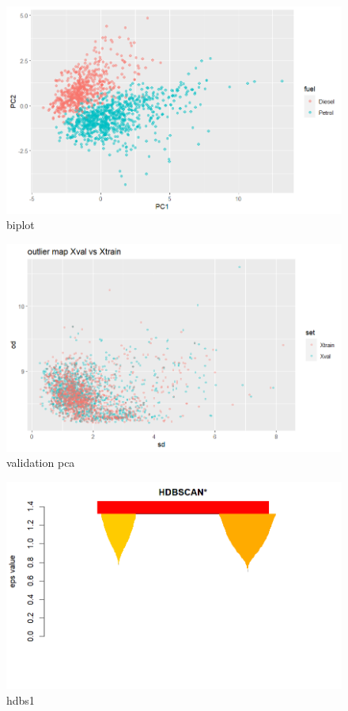 \documentclass{article}
\begin{document}
\begin{figure}[h!]
        \centering
        \includegraphics[width=1.1\textwidth]{../plots/pca.png}
        \caption{biplot}
        \label{fig:biplot}
\end{figure}

\begin{figure}[h!]
        \centering
        \includegraphics[width=1.1\textwidth]{../plots/val_PCA.png}
        \caption{validation pca}
        \label{fig:valpca}
\end{figure}

\begin{figure}[h!]
        \centering
        \includegraphics[width=1.1\textwidth]{../plots/hdbs1.png}
        \caption{hdbs1}
        \label{fig:hdbs1}
\end{figure}
\end{document}
